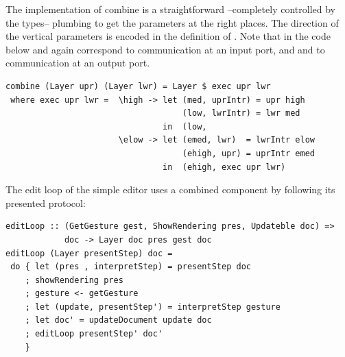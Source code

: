 \documentclass{llncs}
\begin{document}
The implementation of combine is a straightforward --completely controlled by the types-- plumbing to get the parameters at the right places. The direction of the vertical parameters is encoded in the definition of . Note that in the code below  and  again correspond to communication at an input port, and  and  to communication at an output port.

\begin{small}
\begin{verbatim}
combine (Layer upr) (Layer lwr) = Layer $ exec upr lwr
 where exec upr lwr =  \high -> let (med, uprIntr) = upr high
                                    (low, lwrIntr) = lwr med
                                in  (low, 
                       \elow -> let (emed, lwr)  = lwrIntr elow
                                    (ehigh, upr) = uprIntr emed
                                in  (ehigh, exec upr lwr)
\end{verbatim}%
\end{small}

The edit loop of the simple editor uses a combined component by following its presented  protocol:

\begin{small}
\begin{verbatim}
editLoop :: (GetGesture gest, ShowRendering pres, Updateble doc) =>
            doc -> Layer doc pres gest doc
editLoop (Layer presentStep) doc = 
 do { let (pres , interpretStep) = presentStep doc    
    ; showRendering pres
    ; gesture <- getGesture    
    ; let (update, presentStep') = interpretStep gesture    
    ; let doc' = updateDocument update doc    
    ; editLoop presentStep' doc'
    }
\end{verbatim}
\end{small}


\end{document}
